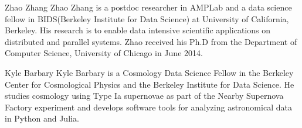 \documentclass[10pt,journal,compsoc]{IEEEtran}
\begin{document}



%



% 

\begin{IEEEbiography}{Zhao Zhang}
Zhao Zhang is a postdoc researcher in AMPLab and a data science fellow in BIDS(Berkeley Institute for Data Science) at University of California, Berkeley. His research is to enable data intensive scientific applications on distributed and parallel systems. Zhao received his Ph.D from the Department of Computer Science, University of Chicago in June 2014.
\end{IEEEbiography}

\begin{IEEEbiography}{Kyle Barbary}
Kyle Barbary is a Cosmology Data Science Fellow in the Berkeley Center for Cosmological Physics and the Berkeley Institute for Data Science. He studies cosmology using Type Ia supernovae as part of the Nearby Supernova Factory experiment and develops software tools for analyzing astronomical data in Python and Julia.
\end{IEEEbiography}
\end{document}
